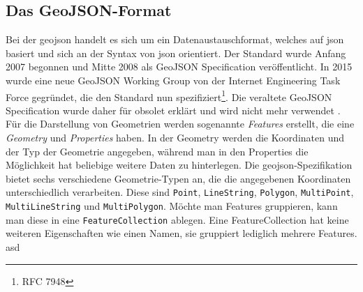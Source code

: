 \subsection{Das GeoJSON-Format}
Bei der \ac{geojson} handelt es sich um ein Datenaustauschformat, welches auf \ac{json} basiert und sich an der Syntax von \ac{json} orientiert. Der Standard wurde Anfang 2007 begonnen und Mitte 2008 als GeoJSON Specification veröffentlicht. In 2015 wurde eine neue GeoJSON Working Group von der Internet Engineering Task Force gegründet, die den Standard nun spezifiziert\footnote{RFC 7948}. Die veraltete GeoJSON Specification wurde daher für obsolet erklärt und wird nicht mehr verwendet \parencite{BUT2008}.\pbreak%
%
Für die Darstellung von Geometrien werden sogenannte \textit{Features} erstellt, die eine \textit{Geometry} und \textit{Properties} haben. In der Geometry werden die Koordinaten und der Typ der Geometrie angegeben, während man in den Properties die Möglichkeit hat beliebige weitere Daten zu hinterlegen. Die \ac{geojson}-Spezifikation bietet sechs verschiedene Geometrie-Typen an, die die angegebenen Koordinaten unterschiedlich verarbeiten. Diese sind \texttt{Point}, \texttt{LineString}, \texttt{Polygon}, \texttt{MultiPoint}, \texttt{MultiLineString} und \texttt{MultiPolygon}.
\pbreak
Möchte man Features gruppieren, kann man diese in eine \texttt{FeatureCollection} ablegen. Eine FeatureCollection hat keine weiteren Eigenschaften wie einen Namen, sie gruppiert lediglich mehrere Features.
\pbreak
asd

